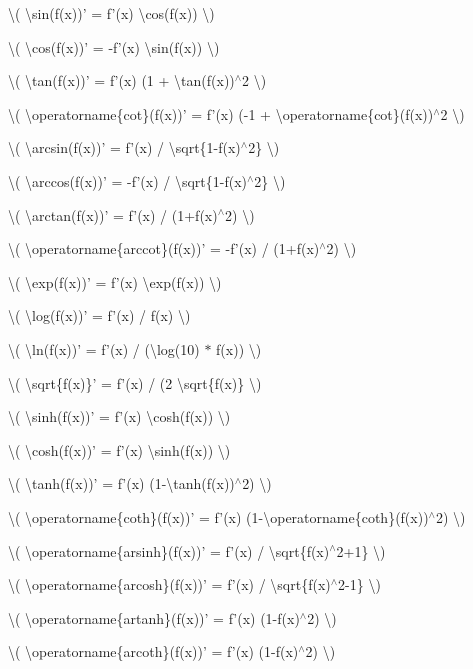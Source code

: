 \begin{DoxyItemize}
\item \textbackslash{}( \textbackslash{}sin(f(x))' = f'(x) \textbackslash{}cos(f(x)) \textbackslash{})
\item \textbackslash{}( \textbackslash{}cos(f(x))' = -\/f'(x) \textbackslash{}sin(f(x)) \textbackslash{})
\item \textbackslash{}( \textbackslash{}tan(f(x))' = f'(x) (1 + \textbackslash{}tan(f(x))$^\wedge$2 \textbackslash{})
\item \textbackslash{}( \textbackslash{}operatorname\{cot\}(f(x))' = f'(x) (-\/1 + \textbackslash{}operatorname\{cot\}(f(x))$^\wedge$2 \textbackslash{})
\item \textbackslash{}( \textbackslash{}arcsin(f(x))' = f'(x) / \textbackslash{}sqrt\{1-\/f(x)$^\wedge$2\} \textbackslash{})
\item \textbackslash{}( \textbackslash{}arccos(f(x))' = -\/f'(x) / \textbackslash{}sqrt\{1-\/f(x)$^\wedge$2\} \textbackslash{})
\item \textbackslash{}( \textbackslash{}arctan(f(x))' = f'(x) / (1+f(x)$^\wedge$2) \textbackslash{})
\item \textbackslash{}( \textbackslash{}operatorname\{arccot\}(f(x))' = -\/f'(x) / (1+f(x)$^\wedge$2) \textbackslash{})
\item \textbackslash{}( \textbackslash{}exp(f(x))' = f'(x) \textbackslash{}exp(f(x)) \textbackslash{})
\item \textbackslash{}( \textbackslash{}log(f(x))' = f'(x) / f(x) \textbackslash{})
\item \textbackslash{}( \textbackslash{}ln(f(x))' = f'(x) / (\textbackslash{}log(10) $\ast$ f(x)) \textbackslash{})
\item \textbackslash{}( \textbackslash{}sqrt\{f(x)\}' = f'(x) / (2 \textbackslash{}sqrt\{f(x)\} \textbackslash{})
\item \textbackslash{}( \textbackslash{}sinh(f(x))' = f'(x) \textbackslash{}cosh(f(x)) \textbackslash{})
\item \textbackslash{}( \textbackslash{}cosh(f(x))' = f'(x) \textbackslash{}sinh(f(x)) \textbackslash{})
\item \textbackslash{}( \textbackslash{}tanh(f(x))' = f'(x) (1-\/\textbackslash{}tanh(f(x))$^\wedge$2) \textbackslash{})
\item \textbackslash{}( \textbackslash{}operatorname\{coth\}(f(x))' = f'(x) (1-\/\textbackslash{}operatorname\{coth\}(f(x))$^\wedge$2) \textbackslash{})
\item \textbackslash{}( \textbackslash{}operatorname\{arsinh\}(f(x))' = f'(x) / \textbackslash{}sqrt\{f(x)$^\wedge$2+1\} \textbackslash{})
\item \textbackslash{}( \textbackslash{}operatorname\{arcosh\}(f(x))' = f'(x) / \textbackslash{}sqrt\{f(x)$^\wedge$2-\/1\} \textbackslash{})
\item \textbackslash{}( \textbackslash{}operatorname\{artanh\}(f(x))' = f'(x) (1-\/f(x)$^\wedge$2) \textbackslash{})
\item \textbackslash{}( \textbackslash{}operatorname\{arcoth\}(f(x))' = f'(x) (1-\/f(x)$^\wedge$2) \textbackslash{})
\end{DoxyItemize}


